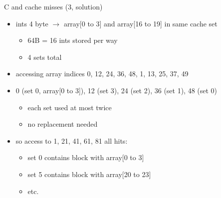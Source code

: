 \begin{frame}[fragile,label=arrayMissesSparse1bAltSoln]{C and cache misses (3, solution)}
    \begin{itemize}
    \item ints 4 byte $\rightarrow$ array[0 to 3] and array[16 to 19] in same cache set
        \begin{itemize}
        \item 64B = 16 ints stored per way
        \item 4 sets total
        \end{itemize}
    \item accessing array indices 0, 12, 24, 36, 48, 1, 13, 25, 37, 49
    \item<3-> 0 (set 0, array[0 to 3]), 12 (set 3), 24 (set 2), 36 (set 1), 48 (set 0)
        \begin{itemize}
        \item each set used at most twice
        \item no replacement needed
        \end{itemize}
    \item so access to 1, 21, 41, 61, 81 all hits:
        \begin{itemize}
        \item set 0 contains block with array[0 to 3]
        \item set 5 contains block with array[20 to 23]
        \item etc.
        \end{itemize}
    \end{itemize}
\end{frame}

